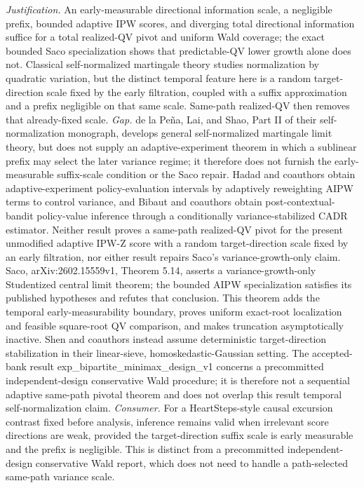 \documentclass{article}
\begin{document}
\par\smallskip\noindent \textit{Justification.} An early-measurable directional information scale, a negligible prefix, bounded adaptive IPW scores, and diverging total directional information suffice for a total realized-QV pivot and uniform Wald coverage; the exact bounded Saco specialization shows that predictable-QV lower growth alone does not. Classical self-normalized martingale theory studies normalization by quadratic variation, but the distinct temporal feature here is a random target-direction scale fixed by the early filtration, coupled with a suffix approximation and a prefix negligible on that same scale. Same-path realized-QV then removes that already-fixed scale. \textit{Gap.} de la Peña, Lai, and Shao, Part II of their self-normalization monograph, develops general self-normalized martingale limit theory, but does not supply an adaptive-experiment theorem in which a sublinear prefix may select the later variance regime; it therefore does not furnish the early-measurable suffix-scale condition or the Saco repair. Hadad and coauthors obtain adaptive-experiment policy-evaluation intervals by adaptively reweighting AIPW terms to control variance, and Bibaut and coauthors obtain post-contextual-bandit policy-value inference through a conditionally variance-stabilized CADR estimator. Neither result proves a same-path realized-QV pivot for the present unmodified adaptive IPW-Z score with a random target-direction scale fixed by an early filtration, nor either result repairs Saco's variance-growth-only claim. Saco, arXiv:2602.15559v1, Theorem 5.14, asserts a variance-growth-only Studentized central limit theorem; the bounded AIPW specialization satisfies its published hypotheses and refutes that conclusion. This theorem adds the temporal early-measurability boundary, proves uniform exact-root localization and feasible square-root QV comparison, and makes truncation asymptotically inactive. Shen and coauthors instead assume deterministic target-direction stabilization in their linear-sieve, homoskedastic-Gaussian setting. The accepted-bank result exp\_bipartite\_minimax\_design\_v1 concerns a precommitted independent-design conservative Wald procedure; it is therefore not a sequential adaptive same-path pivotal theorem and does not overlap this result temporal self-normalization claim. \textit{Consumer.} For a HeartSteps-style causal excursion contrast fixed before analysis, inference remains valid when irrelevant score directions are weak, provided the target-direction suffix scale is early measurable and the prefix is negligible. This is distinct from a precommitted independent-design conservative Wald report, which does not need to handle a path-selected same-path variance scale.
\end{document}
